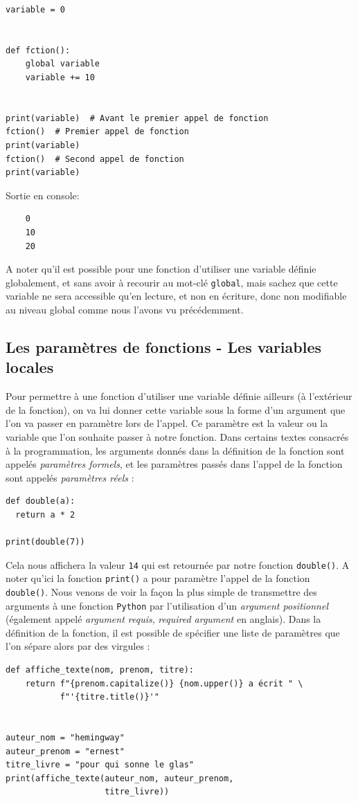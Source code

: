 \documentclass[a4paper,11pt]{book}
\begin{document}
\begin{lstlisting}[caption=Fonction et variable globale]
variable = 0


def fction():
    global variable
    variable += 10


print(variable)  # Avant le premier appel de fonction
fction()  # Premier appel de fonction
print(variable)
fction()  # Second appel de fonction
print(variable)
\end{lstlisting}
\medskip

Sortie en console:
\begin{verbatim}
    0
    10
    20
\end{verbatim}
\medskip

A noter qu'il est possible pour une fonction d'utiliser une variable définie globalement, et sans avoir à recourir au mot-clé \texttt{global}, mais sachez que cette variable ne sera accessible qu'en lecture, et non en écriture, donc non modifiable au niveau global comme nous l'avons vu précédemment.
\medskip

\subsection*{Les paramètres de fonctions - Les variables locales}
Pour permettre à une fonction d'utiliser une variable définie ailleurs (à l'extérieur de la fonction), on va lui donner cette variable sous la forme d'un argument que l'on va passer en paramètre lors de l'appel. Ce paramètre est la valeur ou la variable que l'on souhaite passer à notre fonction. Dans certains textes consacrés à la programmation, les arguments donnés dans la définition de la fonction sont appelés \textit{paramètres formels}, et les paramètres passés dans l'appel de la fonction sont appelés \textit{paramètres réels} :
\begin{lstlisting}[caption=Exemple de fonction avec paramètre]
def double(a):
  return a * 2
	
print(double(7))
\end{lstlisting}
\medskip

Cela nous affichera la valeur \texttt{14} qui est retournée par notre fonction \texttt{double()}. A noter qu'ici la fonction \texttt{print()} a pour paramètre l'appel de la fonction \texttt{double()}. Nous venons de voir la façon la plus simple de transmettre des arguments à une fonction \texttt{Python} par l'utilisation d'un \textit{argument positionnel} (également appelé \textit{argument requis}, \og \textit{required argument}\fg{} en anglais). Dans la définition de la fonction, il est possible de spécifier une liste de paramètres que l'on sépare alors par des virgules :
\medskip
\begin{lstlisting}[caption=Fonction avec plusieurs arguments positionnels]
def affiche_texte(nom, prenom, titre):
    return f"{prenom.capitalize()} {nom.upper()} a écrit " \
           f"'{titre.title()}'"


auteur_nom = "hemingway"
auteur_prenom = "ernest"
titre_livre = "pour qui sonne le glas"
print(affiche_texte(auteur_nom, auteur_prenom, 
                    titre_livre))
\end{lstlisting}
\medskip
\end{document}
